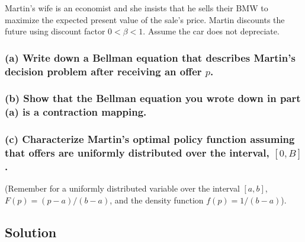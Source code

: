\documentclass[10pt, a4paper]{article}
\begin{document}
    Martin's wife is an economist and she insists that he sells their BMW to maximize the expected present value of the sale's price. Martin discounts the future using discount factor $0 < \beta < 1$. Assume the car does not depreciate.

    \subsubsection*{(a) Write down a Bellman equation that describes Martin's decision problem after receiving an offer $p$.}

    \subsubsection*{(b) Show that the Bellman equation you wrote down in part (a) is a contraction mapping.}

    \subsubsection*{(c) Characterize Martin's optimal policy function assuming that offers are uniformly distributed over the interval, $[0, B]$.}
    (Remember for a uniformly distributed variable over the interval $[a, b]$, $F(p) = (p-a)/(b-a)$, and the density function $f(p) = 1/(b-a)$).

  \subsection*{Solution}
    
\end{document}
